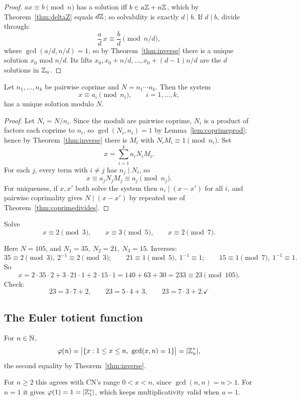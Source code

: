 \documentclass[11pt]{article}
\begin{document}
\begin{proof}
$ax\equiv b\pmod n$ has a solution iff $b\in a\mathbb{Z}+n\mathbb{Z}$, which by Theorem~\ref{thm:deltaZ} equals $d\mathbb{Z}$; so solvability is exactly $d\mid b$. If $d\mid b$, divide through:
\[
\frac ad\,x\equiv\frac bd \pmod{n/d},
\]
where $\gcd(a/d,n/d)=1$, so by Theorem~\ref{thm:inverse} there is a unique solution $x_0$ mod $n/d$. Its lifts $x_0,x_0+n/d,\dots,x_0+(d-1)n/d$ are the $d$ solutions in $\mathbb{Z}_n$.
\end{proof}

\begin{theorem}
\label{thm:crt}
Let $n_1,\dots,n_k$ be pairwise coprime and $N=n_1\cdots n_k$. Then the system
\[
x\equiv a_i \pmod{n_i}, \qquad i=1,\dots,k,
\]
has a unique solution modulo $N$.
\end{theorem}

\begin{proof}
Let $N_i=N/n_i$. Since the moduli are pairwise coprime, $N_i$ is a product of factors each coprime to $n_i$, so $\gcd(N_i,n_i)=1$ by Lemma~\ref{lem:coprimeprod}; hence by Theorem~\ref{thm:inverse} there is $M_i$ with $N_iM_i\equiv1\pmod{n_i}$. Set
\[
x=\sum_{i=1}^{k}a_iN_iM_i.
\]
For each $j$, every term with $i\ne j$ has $n_j\mid N_i$, so
\[
x\equiv a_jN_jM_j\equiv a_j\pmod{n_j}.
\]
For uniqueness, if $x,x'$ both solve the system then $n_i\mid(x-x')$ for all $i$, and pairwise coprimality gives $N\mid(x-x')$ by repeated use of Theorem~\ref{thm:coprimedivides}.
\end{proof}

\begin{example}
Solve
\[
x\equiv2\pmod3, \qquad x\equiv3\pmod5, \qquad x\equiv2\pmod7.
\]

\smallskip
Here $N=105$, and $N_1=35,\ N_2=21,\ N_3=15$. Inverses:
\[
35\equiv2\pmod3,\ 2^{-1}\equiv2\pmod3; \qquad 21\equiv1\pmod5,\ 1^{-1}\equiv1; \qquad 15\equiv1\pmod7,\ 1^{-1}\equiv1.
\]
So
\[
x=2\cdot35\cdot2+3\cdot21\cdot1+2\cdot15\cdot1=140+63+30=233\equiv23\pmod{105}.
\]
Check:
\[
23=3\cdot7+2, \qquad 23=5\cdot4+3, \qquad 23=7\cdot3+2. \checkmark
\]
\end{example}

\subsection{The Euler totient function}
\label{sec:totient}

\begin{definition}\label{def:totient}
For $n\in\mathbb{N}$,
\[
\varphi(n)=\bigl|\{x : 1\le x\le n,\ \gcd(x,n)=1\}\bigr|=|\Z_n^*|,
\]
the second equality by Theorem~\ref{thm:inverse}.
\end{definition}
\begin{note}
For $n\ge2$ this agrees with CN's range $0<x<n$, since $\gcd(n,n)=n>1$. For $n=1$ it gives $\varphi(1)=1=|\mathbb{Z}_1^*|$, which keeps multiplicativity valid when $a=1$.
\end{note}
\end{document}
